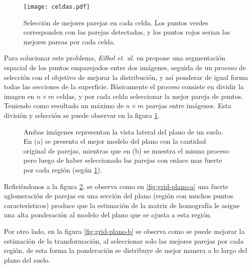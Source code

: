 \begin{figure}[hb]
	\centering
	\texttt{[image: celdas.pdf]}
	\caption[Selección de mejores parejas]{Selección de mejores parejas en cada celda. Los puntos verdes corresponden con las parejas detectadas, y los puntos rojos serian las mejores pareas por cada celda.}
	\label{imagen:celdas}
\end{figure}

Para solucionar este problema, \textit{Eilbol et. al.} en \cite{grid} propone una segmentación espacial de los puntos emparejados entre dos imágenes, seguida de un proceso de selección con el objetivo de mejorar la distribución, y así ponderar de igual forma todas las secciones de la superficie. Básicamente el proceso consiste en dividir la imagen en $n\times m$ celdas, y por cada celda seleccionar la mejor pareja de puntos. Teniendo como resultado un máximo de $n\times m$ parejas entre imágenes. Esta división y selección se puede observar en la figura \ref{imagen:celdas}.

\begin{figure}[ht]
	\centering     %
	
	\caption[Selección de mejores puntos, ejemplo con plano]{Ambas imágenes representan la vista lateral del plano de un suelo. En (a) se presenta el mejor modelo del plano con la cantidad original de parejas, mientras que en (b) se muestra el mismo proceso pero luego de haber seleccionado las parejas con enlace mas fuerte por cada región (según \ref{imagen:celdas}).}
	\label{imagen:grid-plano}
\end{figure}

Refiriéndonos a la figura \ref{imagen:grid-plano}, se observa como en \ref{fig:grid-plano-a} una fuerte aglomeración de parejas en una sección del plano (región con muchos puntos característicos) produce que la estimación de la matriz de homografía le asigne una alta ponderación al modelo del plano que se ajusta a esta región.

Por otro lado, en la figura  \ref{fig:grid-plano-b} se observa como se puede mejorar la estimación de la transformación, al seleccionar solo las mejores parejas por cada región, de esta forma la ponderación se distribuye de mejor manera a lo largo del plano del suelo.

